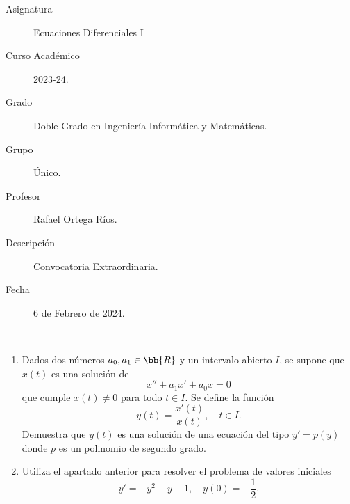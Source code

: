\documentclass[12pt]{article}
\begin{document}

    
    

    \begin{description}
        \item[Asignatura] Ecuaciones Diferenciales I
        \item[Curso Académico] 2023-24.
        \item[Grado] Doble Grado en Ingeniería Informática y Matemáticas.
        \item[Grupo] Único.
        \item[Profesor] Rafael Ortega Ríos.
        \item[Descripción] Convocatoria Extraordinaria.
        \item[Fecha] 6 de Febrero de 2024.
    
    \end{description}
    \newpage

    \begin{ejercicio} [40 puntos] ~
        \begin{enumerate}
            \item Dados dos números $a_0, a_1 \in \bb{R}$ y un intervalo abierto $I$, se supone que $x(t)$ es una solución de
            \[
                x'' + a_1x' + a_0x = 0
            \]
            que cumple $x(t) \neq 0$ para todo $t \in I$. Se define la función
            \[
                y(t) = \frac{x'(t)}{x(t)}, \quad t \in I.
            \]
            Demuestra que $y(t)$ es una solución de una ecuación del tipo $y' = p(y)$ donde $p$ es un polinomio de segundo grado.

            \item Utiliza el apartado anterior para resolver el problema de valores iniciales
            \[
                y' = -y^2 - y - 1, \quad y(0) = -\frac{1}{2}.
            \]
        \end{enumerate}
    \end{ejercicio}
\end{document}
